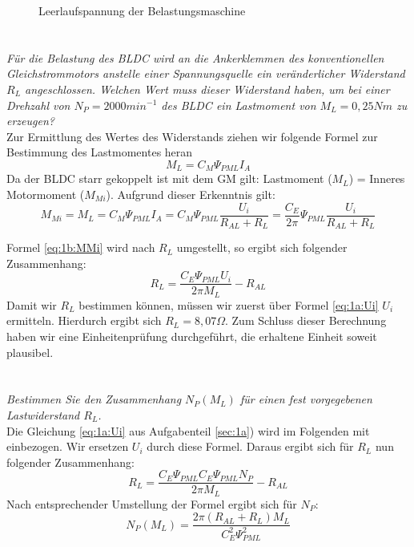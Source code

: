 \begin{figure}[h]
	\centering
	
	\caption{Leerlaufspannung der Belastungsmaschine}
	\label{fig:1a:leerlauf}
\end{figure}



\section{}\label{sec:1b}
\textit{Für die Belastung des BLDC wird an die Ankerklemmen des konventionellen Gleichstrommotors anstelle einer Spannungsquelle ein veränderlicher Widerstand $ R_{L} $ angeschlossen. Welchen Wert muss dieser Widerstand haben, um bei einer Drehzahl von $ N_{P} = 2000 min^{-1} $ des BLDC ein Lastmoment von $ M_{L} = 0,25Nm $ zu erzeugen?}\\ Zur Ermittlung des Wertes des Widerstands ziehen wir folgende Formel zur Bestimmung des Lastmomentes heran
\begin{equation}
	M_{L} = C_{M}\Psi_{PML}I_{A}
	\label{eq:1b:ML}
\end{equation}
Da der BLDC starr gekoppelt ist mit dem GM gilt: Lastmoment ($ M_{L} $) = Inneres Motormoment ($ M_{Mi} $). Aufgrund dieser Erkenntnis gilt:
\begin{equation}
	M_{Mi} = M_{L} = C_{M}\Psi_{PML}I_{A} = C_{M}\Psi_{PML}\frac{U_{i}}{R_{AL}+R_{L}} = \frac{C_{E}}{2\pi}\Psi_{PML}\frac{U_{i}}{R_{AL}+R_{L}}
	\label{eq:1b:MMi}
\end{equation}

Formel \ref{eq:1b:MMi} wird nach $R_{L}$ umgestellt, so ergibt sich folgender Zusammenhang:\\
\begin{equation}
	R_{L} = \frac{C_{E}\Psi_{PML}U_{i}}{2\pi M_{L}} - R_{AL}
\end{equation}
Damit wir $ R_{L} $  bestimmen können, müssen wir zuerst über Formel \ref{eq:1a:Ui} $ U_{i} $ ermitteln. Hierdurch ergibt sich $ R_{L} = 8,07\Omega$. Zum Schluss dieser Berechnung haben wir eine Einheitenprüfung durchgeführt, die erhaltene Einheit soweit plausibel.

\section{}\label{sec:1c}
\textit{Bestimmen Sie den Zusammenhang $ N_{P}(M_{L}) $ für einen fest vorgegebenen Lastwiderstand $ R_{L} $.}\\
Die Gleichung \ref{eq:1a:Ui} aus Aufgabenteil \ref{sec:1a}) wird im Folgenden mit einbezogen. Wir ersetzen $ U_{i} $ durch diese Formel. Daraus ergibt sich für $ R_{L} $ nun folgender Zusammenhang:
\begin{equation}
	R_{L} = \frac{C_{E}\Psi_{PML}C_{E}\Psi_{PML}N_{P}}{2\pi M_{L}} - R_{AL}
	\label{eq:1c:RL}
\end{equation}
Nach entsprechender Umstellung der Formel ergibt sich für $ N_{P} $:
\begin{equation}
	N_{P}(M_{L}) = \frac{2\pi (R_{AL}+R_{L})M_{L}}{C_{E}^{2}\Psi_{PML}^{2}}
	\label{eq:1c:NP}
\end{equation}


\clearpage



